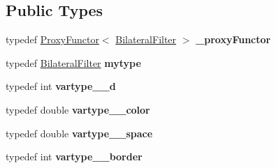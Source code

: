 \subsection*{Public Types}
\begin{DoxyCompactItemize}
\item 
\mbox{\label{classfilter_1_1algos_1_1_bilateral_filter_ac0fb679d2ba322f06eeef56fc58db579}} 
typedef \hyperlink{class_proxy_functor}{Proxy\+Functor}$<$ \hyperlink{classfilter_1_1algos_1_1_bilateral_filter}{Bilateral\+Filter} $>$ {\bfseries \+\_\+proxy\+Functor}
\item 
\mbox{\label{classfilter_1_1algos_1_1_bilateral_filter_a092b23218ad9c4a00cf07ab0ad77bb0c}} 
typedef \hyperlink{classfilter_1_1algos_1_1_bilateral_filter}{Bilateral\+Filter} {\bfseries mytype}
\item 
\mbox{\label{classfilter_1_1algos_1_1_bilateral_filter_a6bc6fd02f140606844f758043a64e3d0}} 
typedef int {\bfseries vartype\+\_\+\+\_\+d}
\item 
\mbox{\label{classfilter_1_1algos_1_1_bilateral_filter_a1893535ebca02fed8a8534a82c2b8bb1}} 
typedef double {\bfseries vartype\+\_\+\+\_\+color}
\item 
\mbox{\label{classfilter_1_1algos_1_1_bilateral_filter_a5d71696ab829a205f7e7fa1ebd6dcde3}} 
typedef double {\bfseries vartype\+\_\+\+\_\+space}
\item 
\mbox{\label{classfilter_1_1algos_1_1_bilateral_filter_a83e67b9b3f0cdfa961c162ee54df2a68}} 
typedef int {\bfseries vartype\+\_\+\+\_\+border}
\end{DoxyCompactItemize}
